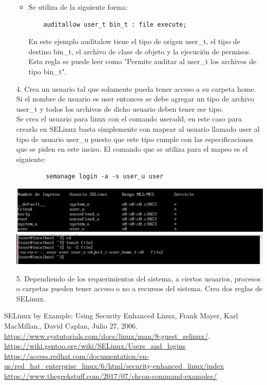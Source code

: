 \documentclass[a4paper, 11pt, oneside]{article}
\begin{document}
\begin{enumerate}
\begin{itemize}
        \item Se utiliza de la siguiente forma:
    \begin{verbatim}
    auditallow user_t bin_t : file execute;    
    \end{verbatim}
        En este ejemplo auditalow tiene el tipo de origen user\_t, el tipo de destino bin\_t, el archivo de clase de objeto y la ejecución de permisos. Esta regla se puede leer como "Permite auditar al user\_t los archivos de tipo bin\_t".

        
    \end{itemize}
    \item[4.] Crea un usuario tal que solamente pueda tener acceso a su carpeta home. Si el nombre
    de usuario es user entonces se debe agregar un tipo de archivo user\_t y todos los
    archivos de dicho usuario deben tener ese tipo.\\
    Se crea el usuario para linux con el comando useradd,  en este caso para crearlo en SELinux basta simplemente con mapear al usuario llamado user al tipo de usuario user\_u  puesto que este tipo cumple con las especificaciones que se piden en este inciso. El comando que se utiliza para el mapeo es el siguiente:
    \begin{verbatim}
        semanage login -a -s user_u user
    \end{verbatim}
    \begin{center}
        \includegraphics[scale=0.25]{CentOS4.png}
        \includegraphics[scale=0.25]{CentOS5.png}
    \end{center}
    
    \item[5.] Dependiendo de los requerimientos del sistema, a ciertos usuarios, procesos o carpetas
    pueden tener acceso o no a recursos del sistema. Crea dos reglas de SELinux.
\end{enumerate}

\begin{thebibliography}{X}
 SELinux by Example: Using Security Enhanced Linux, Frank Mayer, Karl MacMillan,, David Caplan, Julio 27, 2006.
 \url{https://www.systutorials.com/docs/linux/man/8-guest_selinux/}.
 \url{https://wiki.gentoo.org/wiki/SELinux/Users_and_logins}
 \url{https://access.redhat.com/documentation/en-us/red_hat_enterprise_linux/6/html/security-enhanced_linux/index}
 \url{https://www.thegeekstuff.com/2017/07/chcon-command-examples/}
\end{thebibliography}
\end{document}
